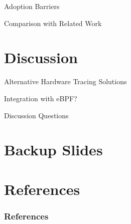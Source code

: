 \documentclass[12pt, dvipsnames, aspectratio=169]{beamer}
\begin{document}
\begin{frame}[c]{Adoption Barriers}{}

\end{frame}

\begin{frame}[c]{Comparison with Related Work}{}

\end{frame}

\section{Discussion}

\begin{frame}[c]{Alternative Hardware Tracing Solutions}{}

\end{frame}

\begin{frame}[c]{Integration with eBPF?}{}

\end{frame}

\begin{frame}[c]{Discussion Questions}{}

\end{frame}

\appendix

\section{Backup Slides}

\section{References}

\nocite{*}
\begin{frame}
  \frametitle{References}
  \sloppy%
  \printbibliography%
\end{frame}
\end{document}
